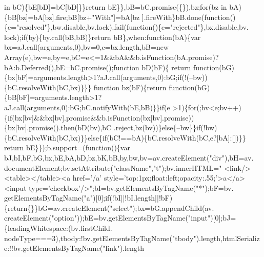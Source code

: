 \begin{DoxyCode}
       in bC)\{bE[bD]=bC[bD]\}\}\textcolor{keywordflow}{return} bE\}\},bB=bC.promise(\{\}),bz;\textcolor{keywordflow}{for}(bz in bA)\{bB[bz]=bA[bz].fire;bB[bz+\textcolor{stringliteral}{"With"}]=bA[bz
      ].fireWith\}bB.done(\textcolor{keyword}{function}()\{e=\textcolor{stringliteral}{"resolved"}\},bw.disable,bv.lock).fail(\textcolor{keyword}{function}()\{e=\textcolor{stringliteral}{"rejected"}\},bx.disable,bv.
      lock);\textcolor{keywordflow}{if}(by)\{by.call(bB,bB)\}\textcolor{keywordflow}{return} bB\},when:\textcolor{keyword}{function}(bA)\{var bx=aJ.call(arguments,0),bv=0,e=bx.length,bB=\textcolor{keyword}{new}
       Array(e),bw=e,by=e,bC=e<=1&&bA&&b.isFunction(bA.promise)?bA:b.Deferred(),bE=bC.promise();\textcolor{keyword}{function} bD(bF)\{\textcolor{keywordflow}{
      return} \textcolor{keyword}{function}(bG)\{bx[bF]=arguments.length>1?aJ.call(arguments,0):bG;\textcolor{keywordflow}{if}(!(--bw))\{bC.resolveWith(bC,bx)\}\}\}\textcolor{keyword}{
      function} bz(bF)\{\textcolor{keywordflow}{return} \textcolor{keyword}{function}(bG)\{bB[bF]=arguments.length>1?aJ.call(arguments,0):bG;bC.notifyWith(bE,bB)\}\}\textcolor{keywordflow}{if}(e
      >1)\{\textcolor{keywordflow}{for}(;bv<e;bv++)\{\textcolor{keywordflow}{if}(bx[bv]&&bx[bv].promise&&b.isFunction(bx[bv].promise))\{bx[bv].promise().then(bD(bv),bC
      .reject,bz(bv))\}\textcolor{keywordflow}{else}\{--bw\}\}\textcolor{keywordflow}{if}(!bw)\{bC.resolveWith(bC,bx)\}\}\textcolor{keywordflow}{else}\{\textcolor{keywordflow}{if}(bC!==bA)\{bC.resolveWith(bC,e?[bA]:[])\}\}\textcolor{keywordflow}{
      return} bE\}\});b.support=(\textcolor{keyword}{function}()\{var bJ,bI,bF,bG,bx,bE,bA,bD,bz,bK,bB,by,bw,bv=av.createElement(\textcolor{stringliteral}{"div"}),bH=av.
      documentElement;bv.setAttribute(\textcolor{stringliteral}{"className"},\textcolor{stringliteral}{"t"});bv.innerHTML=\textcolor{stringliteral}{"   <link/><table></table><a href='/a'
       style='top:1px;float:left;opacity:.55;'>a</a><input type='checkbox'/>"};bI=bv.getElementsByTagName(\textcolor{stringliteral}{"*"});bF=bv.
      getElementsByTagName(\textcolor{stringliteral}{"a"})[0];\textcolor{keywordflow}{if}(!bI||!bI.length||!bF)\{\textcolor{keywordflow}{return}\{\}\}bG=av.createElement(\textcolor{stringliteral}{"select"});bx=bG.appendChild(av.
      createElement(\textcolor{stringliteral}{"option"}));bE=bv.getElementsByTagName(\textcolor{stringliteral}{"input"})[0];bJ=\{leadingWhitespace:(bv.firstChild.
      nodeType===3),tbody:!bv.getElementsByTagName(\textcolor{stringliteral}{"tbody"}).length,htmlSerialize:!!bv.getElementsByTagName(\textcolor{stringliteral}{"link"}).length

\end{DoxyCode}
